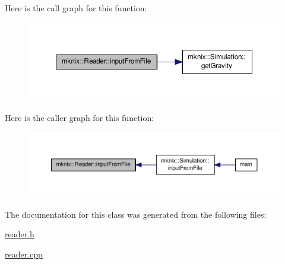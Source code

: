 Here is the call graph for this function\-:\nopagebreak
\begin{figure}[H]
\begin{center}
\leavevmode
\includegraphics[width=350pt]{d0/d66/classmknix_1_1_reader_ab8ac24c56853e5101ac4f2a94d172392_cgraph}
\end{center}
\end{figure}




Here is the caller graph for this function\-:\nopagebreak
\begin{figure}[H]
\begin{center}
\leavevmode
\includegraphics[width=350pt]{d0/d66/classmknix_1_1_reader_ab8ac24c56853e5101ac4f2a94d172392_icgraph}
\end{center}
\end{figure}




The documentation for this class was generated from the following files\-:\begin{DoxyCompactItemize}
\item 
\hyperlink{reader_8h}{reader.\-h}\item 
\hyperlink{reader_8cpp}{reader.\-cpp}\end{DoxyCompactItemize}
